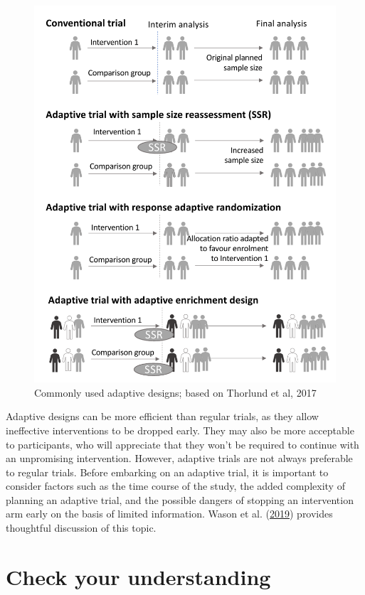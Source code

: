 \documentclass{krantz}
\begin{document}
\begin{figure}

{\centering \includegraphics[width=0.9\linewidth]{images_bw/AdaptiveInfographic} 

}

\caption{Commonly used adaptive designs; based on Thorlund et al, 2017}\label{fig:adaptivefig}
\end{figure}

Adaptive designs can be more efficient than regular trials, as they allow ineffective interventions to be dropped early. They may also be more acceptable to participants, who will appreciate that they won't be required to continue with an unpromising intervention. However, adaptive trials are not always preferable to regular trials. Before embarking on an adaptive trial, it is important to consider factors such as the time course of the study, the added complexity of planning an adaptive trial, and the possible dangers of stopping an intervention arm early on the basis of limited information. Wason et al. (\protect\hyperlink{ref-wason2019}{2019}) provides thoughtful discussion of this topic.

\hypertarget{check-your-understanding-16}{%
\section{Check your understanding}\label{check-your-understanding-16}}
\end{document}

